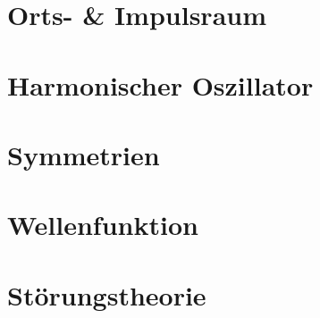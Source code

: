\documentclass[12pt,a4paper]{report}
\begin{document}


\chapter{Orts- \& Impulsraum}



\chapter{Harmonischer Oszillator}



\chapter{Symmetrien}



\chapter{Wellenfunktion}



\chapter{Störungstheorie}


\end{document}
